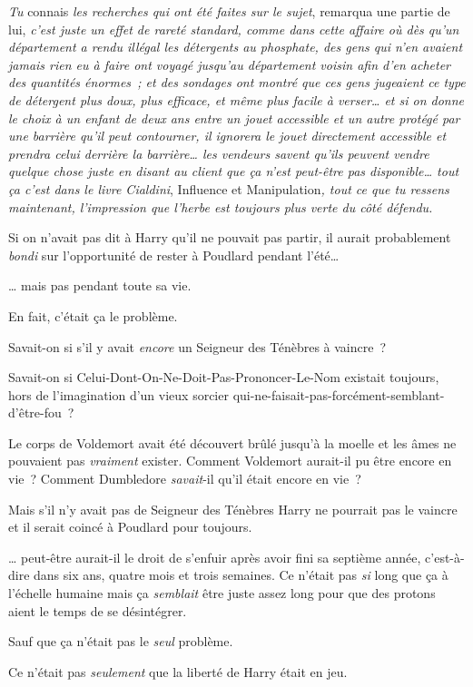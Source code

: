 \emph{Tu} connais \emph{les recherches qui ont été faites sur le sujet}, remarqua une partie de lui, \emph{c'est juste un effet de rareté standard, comme dans cette affaire où dès qu'un département a rendu illégal les détergents au phosphate, des gens qui n'en avaient jamais rien eu à faire ont voyagé jusqu'au département voisin afin d'en acheter des quantités énormes~; et des sondages ont montré que ces gens jugeaient ce type de détergent plus doux, plus efficace, et même plus facile à verser… et si on donne le choix à un enfant de deux ans entre un jouet accessible et un autre protégé par une barrière qu'il peut contourner, il ignorera le jouet directement accessible et prendra celui derrière la barrière… les vendeurs savent qu'ils peuvent vendre quelque chose juste en disant au client que ça n'est peut-être pas disponible… tout ça c'est dans le livre Cialdini}, Influence et Manipulation\emph{, tout ce que tu ressens maintenant, l'impression que l'herbe est toujours plus verte du côté défendu.}

Si on n'avait pas dit à Harry qu'il ne pouvait pas partir, il aurait probablement \emph{bondi} sur l'opportunité de rester à Poudlard pendant l'été…

… mais pas pendant toute sa vie.

En fait, c'était ça le problème.

Savait-on si s'il y avait \emph{encore} un Seigneur des Ténèbres à vaincre~?

Savait-on si Celui-Dont-On-Ne-Doit-Pas-Prononcer-Le-Nom existait toujours, hors de l'imagination d'un vieux sorcier qui-ne-faisait-pas-forcément-semblant-d'être-fou~?

Le corps de Voldemort avait été découvert brûlé jusqu'à la moelle et les âmes ne pouvaient pas \emph{vraiment} exister. Comment Voldemort aurait-il pu être encore en vie~? Comment Dumbledore \emph{savait}-il qu'il était encore en vie~?

Mais s'il n'y avait pas de Seigneur des Ténèbres Harry ne pourrait pas le vaincre et il serait coincé à Poudlard pour toujours.

… peut-être aurait-il le droit de s'enfuir après avoir fini sa septième année, c'est-à-dire dans six ans, quatre mois et trois semaines. Ce n'était pas \emph{si} long que ça à l'échelle humaine mais ça \emph{semblait} être juste assez long pour que des protons aient le temps de se désintégrer.

Sauf que ça n'était pas le \emph{seul} problème.

Ce n'était pas \emph{seulement} que la liberté de Harry était en jeu.

